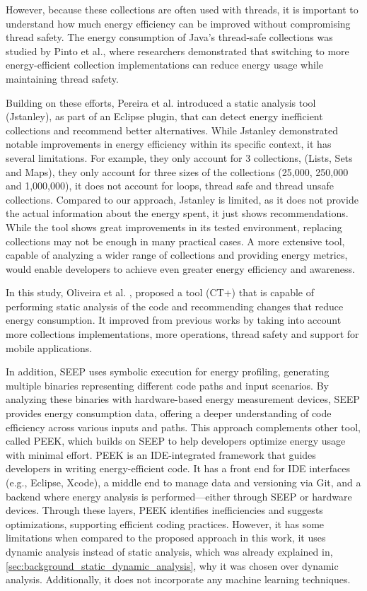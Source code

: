 \documentclass[sigplan]{acmart}
\begin{document}
However, because these collections are often used with threads, it is important to understand how much energy efficiency can be improved without compromising thread safety. The energy consumption of Java's thread-safe collections was studied by Pinto et al.\cite{7816451}, where researchers demonstrated that switching to more energy-efficient collection implementations can reduce energy usage while maintaining thread safety.

Building on these efforts, Pereira et al. \cite{10.1145/3238147.3240473} introduced a static analysis tool (Jstanley), as part of an Eclipse plugin, that can detect energy inefficient collections and recommend better alternatives. While Jstanley demonstrated notable improvements in energy efficiency within its specific context, it has several limitations.
For example, they only account for 3 collections, (Lists, Sets and Maps), they only account for three sizes of the collections (25,000, 250,000 and 1,000,000), it does not account for loops, thread safe and thread unsafe collections. Compared to our approach, Jstanley is limited, as it does not provide the actual information about the energy spent, it just shows recommendations. While the tool shows great improvements in its tested environment, replacing collections may not be enough in many practical cases. A more extensive tool, capable of analyzing a wider range of collections and providing energy metrics, would enable developers to achieve even greater energy efficiency and awareness.

In this study, Oliveira et al. \cite{8816747}, proposed a tool (CT+) that is capable of performing static analysis of the code and recommending changes that reduce energy consumption. It improved from previous works by taking into account more collections implementations, more operations, thread safety and support for mobile applications. 

In addition, SEEP \cite{10.1145/2094091.2094106} uses symbolic execution for energy profiling, generating multiple binaries representing different code paths and input scenarios. By analyzing these binaries with hardware-based energy measurement devices, SEEP provides energy consumption data, offering a deeper understanding of code efficiency across various inputs and paths. This approach complements other tool, called PEEK\cite{187026}, which builds on SEEP to help developers optimize energy usage with minimal effort. PEEK is an IDE-integrated framework that guides developers in writing energy-efficient code. It has a front end for IDE interfaces (e.g., Eclipse, Xcode), a middle end to manage data and versioning via Git, and a backend where energy analysis is performed—either through SEEP or hardware devices. Through these layers, PEEK identifies inefficiencies and suggests optimizations, supporting efficient coding practices. However, it has some limitations when compared to the proposed approach in this work, it uses dynamic analysis instead of static analysis, which was already explained in, \ref{sec:background_static_dynamic_analysis}, why it was chosen over dynamic analysis. Additionally, it does not incorporate any machine learning techniques.
\end{document}
